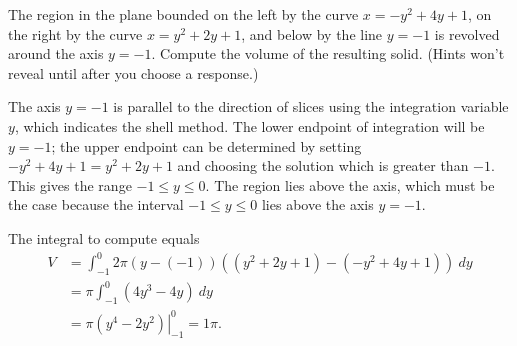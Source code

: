 \documentclass{ximera}
\begin{document}
\begin{question}%

The region in the plane bounded on the left by the curve \(x=-y^2+4y+1\), on the right by the curve \(x=y^2+2y+1\), and below by the line \(y = -1\) is revolved around the axis \(y = -1\). Compute the volume of the resulting solid.
(Hints won't reveal until after you choose a response.)
\begin{multiplechoice}
\choice[correct]{\(\pi\)}
\choice{\(5\pi\)}
\choice{\(9\pi\)}
\choice{\(13\pi\)}
\choice{\(17\pi\)}
\choice{\(21\pi\)}
\end{multiplechoice}
\begin{feedback}
The axis \(y = -1\) is parallel to the direction of slices using the integration variable \(y\), which indicates the shell method. The lower endpoint of integration will be \(y = -1\); the upper endpoint can be determined by setting \(-y^2+4y+1 = y^2+2y+1\) and choosing the solution which is greater than \(-1\). This gives the range \(-1 \leq y \leq 0\). 
 The region lies above the axis, which must be the case because the interval \(-1 \leq y \leq 0\) lies above the axis \(y = -1\).
 \begin{hint}
The integral to compute equals \[ \begin{aligned} V &= \int_{-1}^{0}2 \pi (y-(-1))((y^2+2y+1)-(-y^2+4y+1))~ dy\\
& = \pi \int_{-1}^{0} (4y^3-4y)~ dy\\
& = \pi \left. \left(y^4-2y^2\right) \right|_{-1}^{0} = 1\pi. \end{aligned}\]
\end{hint}
\end{feedback}

\end{question}
\end{document}
